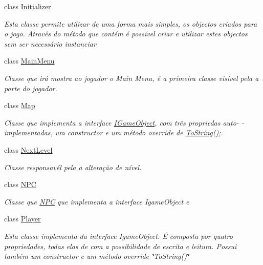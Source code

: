 \begin{DoxyCompactItemize}
class \mbox{\hyperlink{class_projeto2___l_p1_1_1_initializer}{Initializer}}
\begin{DoxyCompactList}\small\item\em Esta classe permite utilizar de uma forma mais simples, os objectos criados para o jogo. Através do método que contém é possível criar e utilizar estes objectos sem ser necessário instanciar \end{DoxyCompactList}\item 
class \mbox{\hyperlink{class_projeto2___l_p1_1_1_main_menu}{Main\+Menu}}
\begin{DoxyCompactList}\small\item\em Classe que irá mostra ao jogador o Main Menu, é a primeira classe visível pela a parte do jogador. \end{DoxyCompactList}\item 
class \mbox{\hyperlink{class_projeto2___l_p1_1_1_map}{Map}}
\begin{DoxyCompactList}\small\item\em Classe que implementa a interface \mbox{\hyperlink{interface_projeto2___l_p1_1_1_i_game_object}{I\+Game\+Object}}, com três propriedas auto-\/ -\/implementadas, um constructor e um método override de \mbox{\hyperlink{class_projeto2___l_p1_1_1_map_a4693bc7aa33a5c2c98d99dcd5dc1f524}{To\+String()}};. \end{DoxyCompactList}\item 
class \mbox{\hyperlink{class_projeto2___l_p1_1_1_next_level}{Next\+Level}}
\begin{DoxyCompactList}\small\item\em Classe responsavél pela a alteração de nível. \end{DoxyCompactList}\item 
class \mbox{\hyperlink{class_projeto2___l_p1_1_1_n_p_c}{N\+PC}}
\begin{DoxyCompactList}\small\item\em Classe que \mbox{\hyperlink{class_projeto2___l_p1_1_1_n_p_c}{N\+PC}} que implementa a interface Igame\+Object e \end{DoxyCompactList}\item 
class \mbox{\hyperlink{class_projeto2___l_p1_1_1_player}{Player}}
\begin{DoxyCompactList}\small\item\em Esta classe implementa da interface Igame\+Object. É composta por quatro propriedades, todas elas de com a possibilidade de escrita e leitura. Possui também um constructor e um método override \char`\"{}\+To\+String()\char`\"{} \end{DoxyCompactList}\item 

\end{DoxyCompactItemize}
